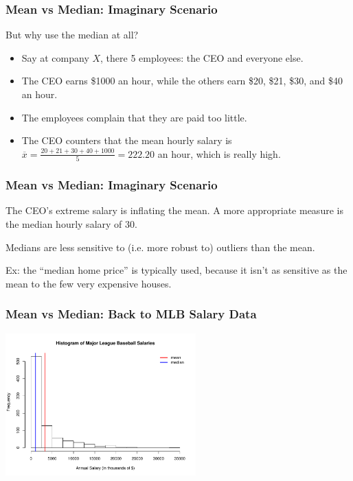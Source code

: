 \documentclass[handout]{beamer}
\newcommand{\blue}[1]{\textcolor{blue2}{#1}}
\begin{document}
\begin{frame}
\frametitle{Mean vs Median: Imaginary Scenario}

But why use the median at all?

\begin{itemize}
\item Say at company $X$, there 5 employees:  the CEO and everyone else.  
\pause\item The CEO earns \$1000 an hour, while the others earn \$20, \$21, \$30, and \$40 an hour. 
\pause\item The employees complain that they are paid too little.  
\pause\item The CEO counters that the mean hourly salary is $\overline{x}=\frac{20+21+30+40+1000}{5} = 222.20$ an hour, which is really high.
\end{itemize}

\end{frame}


\begin{frame}
\frametitle{Mean vs Median: Imaginary Scenario}
The CEO's extreme salary is inflating the mean.  A more appropriate measure is the median hourly salary of $30$.

\vspace{0.5cm}

\pause Medians are less sensitive to (i.e. more \blue{robust} to) \blue{outliers} than the mean.

\vspace{0.5cm}

\pause Ex: the ``median home price'' is typically used, because it isn't as sensitive as the mean to the few very expensive houses.
\end{frame}


\begin{frame}
\frametitle{Mean vs Median: Back to MLB Salary Data}

\begin{center}
\includegraphics[height=5.5cm]{figure/MLB2.pdf}
\end{center}

\end{frame}
\end{document}
